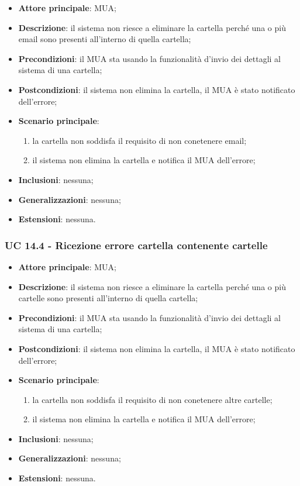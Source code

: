     \begin{itemize}
        \item \textbf{Attore principale}: MUA;
        \item \textbf{Descrizione}: il sistema non riesce a eliminare la cartella perché una o più email sono presenti all'interno di quella cartella;
        \item \textbf{Precondizioni}: il MUA sta usando la funzionalità d'invio dei dettagli al sistema di una cartella;
        \item \textbf{Postcondizioni}: il sistema non elimina la cartella, il MUA è stato notificato dell'errore;
        \item \textbf{Scenario principale}:
            \begin{enumerate}
                \item la cartella non soddisfa il requisito di non conetenere email;
                \item il sistema non elimina la cartella e notifica il MUA dell'errore;
            \end{enumerate}
        \item \textbf{Inclusioni}: nessuna;
        \item \textbf{Generalizzazioni}: nessuna;
        \item \textbf{Estensioni}: nessuna.
    \end{itemize}


    \subsubsection{UC 14.4 - Ricezione errore cartella contenente cartelle} \label{sec:UC14.4}

    \begin{itemize}
        \item \textbf{Attore principale}: MUA;
        \item \textbf{Descrizione}: il sistema non riesce a eliminare la cartella perché una o più cartelle sono presenti all'interno di quella cartella;
        \item \textbf{Precondizioni}: il MUA sta usando la funzionalità d'invio dei dettagli al sistema di una cartella;
        \item \textbf{Postcondizioni}: il sistema non elimina la cartella, il MUA è stato notificato dell'errore;
        \item \textbf{Scenario principale}:
            \begin{enumerate}
                \item la cartella non soddisfa il requisito di non conetenere altre cartelle;
                \item il sistema non elimina la cartella e notifica il MUA dell'errore;
            \end{enumerate}
        \item \textbf{Inclusioni}: nessuna;
        \item \textbf{Generalizzazioni}: nessuna;
        \item \textbf{Estensioni}: nessuna.
    \end{itemize}

